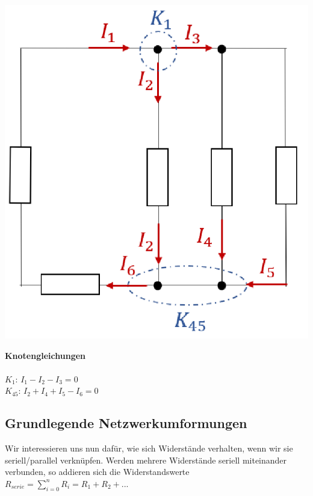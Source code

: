 \begin{minipage}{0.6\textwidth}
	\begin{flushright}
		\includegraphics[scale=0.4]{img/knotengl.png}
	\end{flushright}
\end{minipage}
\begin{minipage}{0.4\textwidth}

	\textbf{Knotengleichungen} \\ \\
	$\displaystyle K_1$: $ I_1 - I_2 - I_3 = 0 $ \\
	$\displaystyle K_{45}$: $ I_2 + I_4 + I_5 - I_6 = 0 $ \\
\end{minipage}


\newpage

\subsection{Grundlegende Netzwerkumformungen}
Wir interessieren uns nun dafür, wie sich Widerstände verhalten, wenn wir sie seriell/parallel verknüpfen.
\beginip
Werden mehrere Widerstände seriell miteinander verbunden, so addieren sich die Widerstandswerte \\
\formulaBegin
$\displaystyle R_{serie} = \sum_{i=0}^n R_i = R_1 + R_2 + ...$
\formulaEnd
\iend

